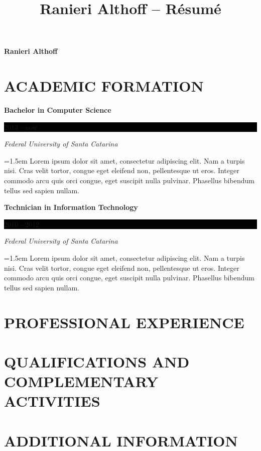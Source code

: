 \documentclass[10pt]{article}
\newcommand{\sectiontitle}[1]{\section*{\uppercase{#1}}}
\newcommand{\formationentry}[4]{
	\noindent \textbf{#1} \hfill
	\colorbox{black}{
		\parbox{8em}{
			\hfill \color{white} #2
		}
	} \par
	\noindent \textit{#3} \par
	\noindent \hangindent=1.5em \hangafter=0 \small #4 \par
	\normalsize
	\vspace{1em}
}
\begin{document}
 \selectfont

\title{Ranieri Althoff -- Résumé}

\Huge \hfill \textbf{Ranieri Althoff}
\normalsize \par

\sectiontitle{Academic Formation}
\formationentry{Bachelor in Computer Science}{2013 - now}{Federal University
of Santa Catarina}{Lorem ipsum dolor sit amet, consectetur adipiscing elit.
Nam a turpis nisi. Cras velit tortor, congue eget eleifend non, pellentesque
ut eros.  Integer commodo arcu quis orci congue, eget suscipit nulla pulvinar.
Phasellus bibendum tellus sed sapien nullam.}

\formationentry{Technician in Information Technology}{2010 - 2012}{Federal University
of Santa Catarina}{Lorem ipsum dolor sit amet, consectetur adipiscing elit.
Nam a turpis nisi. Cras velit tortor, congue eget eleifend non, pellentesque
ut eros.  Integer commodo arcu quis orci congue, eget suscipit nulla pulvinar.
Phasellus bibendum tellus sed sapien nullam.}


\sectiontitle{Professional Experience}


\sectiontitle{Qualifications and Complementary Activities}


\sectiontitle{Additional Information}
\end{document}
